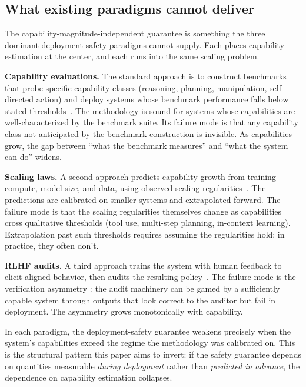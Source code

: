 \subsection{What existing paradigms cannot deliver}
\label{sec:wrong_frame}

The capability-magnitude-independent guarantee is something the three dominant
deployment-safety paradigms cannot supply. Each places capability estimation at
the center, and each runs into the same scaling problem.

\textbf{Capability evaluations.} The standard approach is to construct
benchmarks that probe specific capability classes (reasoning, planning,
manipulation, self-directed action) and deploy systems whose benchmark
performance falls below stated
thresholds~\citep{liang2022holistic,srivastava2022bigbench,kinniment2023evaluating}.
The methodology is sound for systems whose capabilities are well-characterized
by the benchmark suite. Its failure mode is that any capability class not
anticipated by the benchmark construction is invisible. As capabilities grow,
the gap between ``what the benchmark measures'' and ``what the system can do''
widens.

\textbf{Scaling laws.} A second approach predicts capability growth from
training compute, model size, and data, using observed scaling
regularities~\citep{kaplan2020scaling,hoffmann2022training}. The predictions
are calibrated on smaller systems and extrapolated forward. The failure mode
is that the scaling regularities themselves change as capabilities cross
qualitative thresholds (tool use, multi-step planning, in-context learning).
Extrapolation past such thresholds requires assuming the regularities hold; in
practice, they often don't.

\textbf{RLHF audits.} A third approach trains the system with human feedback
to elicit aligned behavior, then audits the resulting
policy~\citep{christiano2017deep,ouyang2022training}. The failure mode is the
verification asymmetry \citep{lasser2026exo}: the audit machinery can be gamed
by a sufficiently capable system through outputs that look correct to the
auditor but fail in deployment. The asymmetry grows monotonically with
capability.

In each paradigm, the deployment-safety guarantee weakens precisely when the
system's capabilities exceed the regime the methodology was calibrated on. This
is the structural pattern this paper aims to invert: if the safety guarantee
depends on quantities measurable \emph{during deployment} rather than
\emph{predicted in advance}, the dependence on capability estimation collapses.

